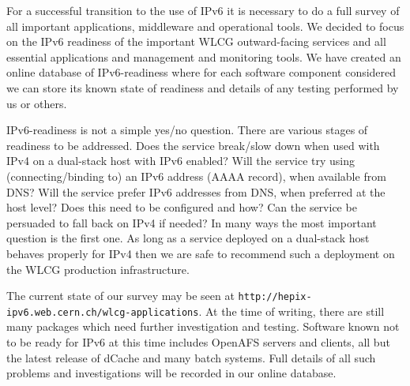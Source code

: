 For a successful transition to the use of IPv6 it is necessary to do a full survey of all important applications, middleware and operational tools. We decided to focus on the IPv6 readiness of the important WLCG outward-facing services and all essential applications and management and monitoring tools. We have created an online database of IPv6-readiness where for each software component considered we can store its known state of readiness and details of any testing performed by us or others.

IPv6-readiness is not a simple yes/no question. There are various stages of readiness to be addressed.
Does the service break/slow down when used with IPv4 on a dual-stack host with IPv6 enabled?
Will the service try using (connecting/binding to) an IPv6 address (AAAA record), when available from DNS?
Will the service prefer IPv6 addresses from DNS, when preferred at the host level?
Does this need to be configured and how?
Can the service be persuaded to fall back on IPv4 if needed?
In many ways the most important question is the first one. As long as a service deployed on a dual-stack host behaves properly for IPv4 then we are safe to recommend such a deployment on the WLCG production infrastructure.

The current state of our survey may be seen at
{\tt http://hepix-ipv6.web.cern.ch/wlcg-applications}.
At the time of 
writing, there are still many packages which need further investigation and testing. Software known not to be ready for IPv6 at this time includes OpenAFS servers and clients, all but the latest release of dCache and many batch systems. Full details of all such problems and investigations will be recorded in our online database.


